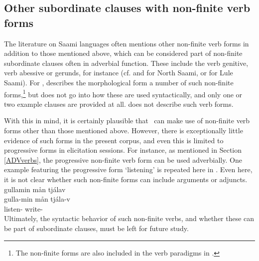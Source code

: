 \subsection{Other subordinate clauses with non-finite verb forms}\label{otherSubclauses}
The literature on Saami languages often mentions other non-finite verb forms in addition to those mentioned above, which can be considered part of non-finite subordinate clauses often in adverbial function. These include the verb genitive, verb abessive or gerunds, for instance (cf. \citet[103-104]{Sammallahti1998} and \citet[67-73]{Svonni2009} for North Saami, or \citet[104-111]{Spiik1989} for Lule Saami). 
For \PS, \citet[95-106]{Lehtiranta1992} describes the morphological form a number of such non-finite forms,\footnote{The non-finite forms are also included in the verb paradigms in \citet[150-155]{Lehtiranta1992}.} 
but does not go into how these are used syntactically, and only one or two example clauses are provided at all. \citet{Lagercrantz1926} does not describe such verb forms. 

With this in mind, it is certainly plausible that \PS\ can make use of non-finite verb forms other than those mentioned above. However, there is exceptionally little evidence of such forms in the present corpus, and even this is limited to progressive forms in elicitation sessions. For instance, as mentioned in Section \ref{ADVverbs}, the progressive non-finite verb form can be used adverbially. One example featuring the progressive form  ‘listening’ is repeated here in . Even here, it is not clear whether such non-finite forms can include arguments or adjuncts. 
\ea\label{ADVverbsEx2repeat}%
\glll	gullamin mån tjálav\\
	gulla-min mån tjála-v\\
	listen-  write-\\\nopagebreak
{}	
\z
Ultimately, the syntactic behavior of such non-finite verbs, and whether these can be part of subordinate clauses, must be left for future study.  


